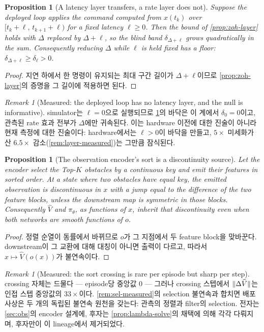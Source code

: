 \documentclass[11pt]{article}
\theoremstyle{plain}
\newtheorem{proposition}[theorem]{Proposition}
\theoremstyle{definition}
\theoremstyle{remark}
\newtheorem{remark}[theorem]{Remark}
\DeclarePairedDelimiter{\norm}{\lVert}{\rVert}
\newcommand{\Vhat}{\widehat V}
\begin{document}
\begin{proposition}[A latency layer transfers, a rate layer does not]\label{prop:lag-transfer}
Suppose the deployed loop applies the command computed from $x(t_k)$ over
$[t_k+\ell,\,t_{k+1}+\ell)$ for a fixed latency $\ell\ge0$. Then the bound of
\cref{prop:zoh-layer} holds with $\Delta$ replaced by $\Delta+\ell$, so the blind band
$\delta_{\Delta+\ell}$ grows quadratically in the sum. Consequently reducing $\Delta$ while
$\ell$ is held fixed has a floor: $\delta_{\Delta+\ell}\ge\delta_\ell>0$.
\end{proposition}
\begin{proof}
지연 하에서 한 명령이 유지되는 최대 구간 길이가 $\Delta+\ell$이므로 \cref{prop:zoh-layer}의
증명을 그 길이에 적용하면 된다.
\end{proof}

\begin{remark}[Measured: the deployed loop has no latency layer, and the null is informative]\label{rem:lag-null}
simulator는 $\ell=0$으로 실행되므로 \cref{prop:lag-transfer}의 바닥은 이 계에서 $\delta_0=0$이고,
관측된 rate 효과 전부가 $\Delta$에만 귀속된다. 이는 hardware 이전에 대한 진술이 아니라 현재
측정에 대한 진술이다: hardware에서는 $\ell>0$이 바닥을 만들고, $5\times$ 미세화가 산 $6.5\times$
감소(\cref{rem:layer-measured})는 그만큼 잠식된다.
\end{remark}

\begin{proposition}[The observation encoder's sort is a discontinuity source]\label{prop:obs-chain}
Let the encoder select the Top-$K$ obstacles by a continuous key and emit their features in
sorted order. At a state where two obstacles have equal key, the emitted observation is
discontinuous in $x$ with a jump equal to the difference of the two feature blocks, unless the
downstream map is symmetric in those blocks. Consequently $\Vhat$ and $\pi_\theta$, as functions
of $x$, inherit that discontinuity even when both networks are smooth functions of $o$.
\end{proposition}
\begin{proof}
정렬 순열이 동률에서 바뀌므로 $o$가 그 지점에서 두 feature block을 맞바꾼다. downstream이
그 교환에 대해 대칭이 아니면 출력이 다르고, 따라서 $x\mapsto\Vhat(o(x))$가 불연속이다.
\end{proof}

\begin{remark}[Measured: the sort crossing is rare per episode but sharp per step]\label{rem:obs-chain-measured}
crossing 자체는 드물다 --- episode당 중앙값 $0$ --- 그러나 crossing 스텝에서
$\norm{\Delta\Vhat}$는 인접 스텝 중앙값의 $33\times$이다. \cref{rem:sel-measured}의 selection
불연속과 합치면 배포 사상은 두 개의 독립된 불연속 원천을 갖는다: 관측의 정렬과 filter의 selection.
전자는 \cref{sec:obs}의 encoder 설계에, 후자는 \cref{prop:lambda-solve}의 채택에 의해 각각
다뤄지며, 후자만이 이 lineage에서 제거되었다.
\end{remark}
\end{document}
